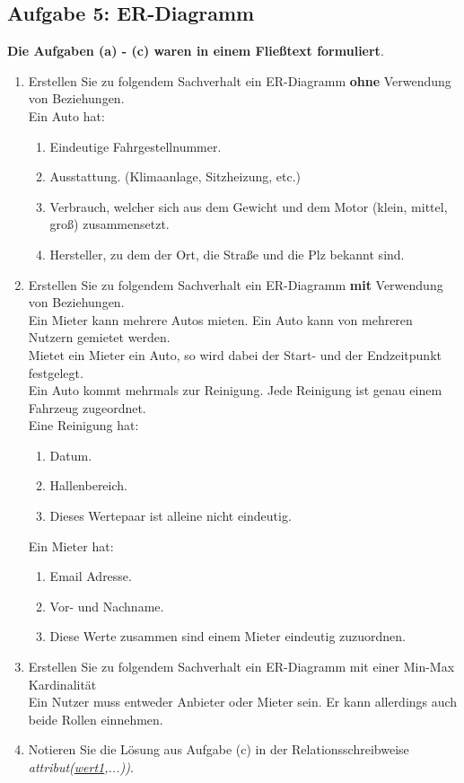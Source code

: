 \newpage
\subsection{Aufgabe 5: ER-Diagramm}
\label{sec:Aufgabe5}
\textbf{Die Aufgaben (a) - (c) waren in einem Fließtext formuliert}.
\begin{enumerate}[label=\alph*)]
    \item Erstellen Sie zu folgendem Sachverhalt ein ER-Diagramm \textbf{ohne} Verwendung von Beziehungen.
    \\[0.5cm]
    Ein Auto hat:
    \begin{enumerate}[label=\arabic*.]
        \item Eindeutige Fahrgestellnummer.
        \item Ausstattung. (Klimaanlage, Sitzheizung, etc.)
        \item Verbrauch, welcher sich aus dem Gewicht und dem Motor (klein, mittel, groß) zusammensetzt.
        \item Hersteller, zu dem der Ort, die Straße und die Plz bekannt sind.
    \end{enumerate}
    
    \item Erstellen Sie zu folgendem Sachverhalt ein ER-Diagramm \textbf{mit} Verwendung von Beziehungen.
    \\[0.5cm]
    Ein Mieter kann mehrere Autos mieten. Ein Auto kann von mehreren Nutzern gemietet werden.
    \\
    Mietet ein Mieter ein Auto, so wird dabei der Start- und der Endzeitpunkt festgelegt.
    \\
    Ein Auto kommt mehrmals zur Reinigung. Jede Reinigung ist genau einem Fahrzeug zugeordnet.
    \\[0.2cm]
    Eine Reinigung hat:
    \begin{enumerate}[label=\arabic*.]
        \item Datum.
        \item Hallenbereich.
        \item Dieses Wertepaar ist alleine nicht eindeutig.
    \end{enumerate}
    Ein Mieter hat:
    \begin{enumerate}[label=\arabic*.]
        \item Email Adresse.
        \item Vor- und Nachname.
        \item Diese Werte zusammen sind einem Mieter eindeutig zuzuordnen.
    \end{enumerate}

    \item
    Erstellen Sie zu folgendem Sachverhalt ein ER-Diagramm mit einer Min-Max Kardinalität
    \\[0.5cm]
    Ein Nutzer muss entweder Anbieter oder Mieter sein. Er kann allerdings auch beide Rollen einnehmen.

    \item Notieren Sie die Lösung aus Aufgabe (c) in der Relationsschreibweise \textit{attribut(\underline{wert1},...))}.
\end{enumerate}
